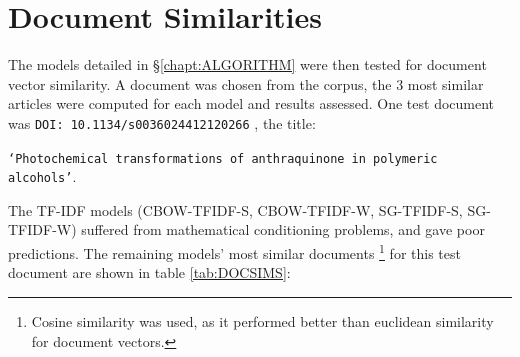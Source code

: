 \section{Document Similarities}
The models detailed in \S\ref{chapt:ALGORITHM} were then tested for document vector similarity. A document was chosen from the corpus, the 3 most similar articles were computed for each model and results assessed. One test document was \texttt{DOI: 10.1134/s0036024412120266} \cite{docassay}, the title:


\texttt{`Photochemical transformations of anthraquinone in polymeric alcohols'}.

 The TF-IDF models (CBOW-TFIDF-S, CBOW-TFIDF-W, SG-TFIDF-S, SG-TFIDF-W) suffered from mathematical conditioning problems, and gave poor predictions. The remaining models' most similar documents \footnote{Cosine similarity was used, as it performed better than euclidean similarity for document vectors.} for this test document are shown in table \ref{tab:DOCSIMS}:
